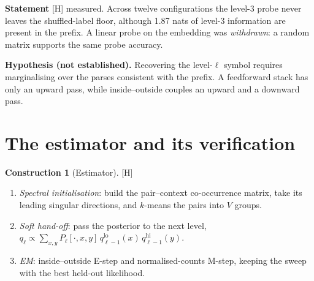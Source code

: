 \documentclass[11pt]{article}
\theoremstyle{definition}
\newtheorem{construction}[theorem]{Construction}
\theoremstyle{remark}
\newcommand{\src}[1]{\textsf{\small[#1]}}
\newcommand{\st}[1]{\textsf{\small\color{gray}#1}}
\begin{document}
\noindent\textbf{Statement} \src{H} \st{measured}. Across twelve configurations the level-3 probe never leaves the shuffled-label floor, although 1.87 nats of level-3 information are present in the prefix. A linear probe on the embedding was \emph{withdrawn}: a random matrix supports the same probe accuracy.

\noindent\textbf{Hypothesis (not established).} Recovering the level-$\ell$ symbol requires marginalising over the parses consistent with the prefix. A feedforward stack has only an upward pass, while inside--outside couples an upward and a downward pass.

\section{The estimator and its verification}
\begin{construction}[Estimator]\src{H}
\begin{enumerate}
  \item \emph{Spectral initialisation}: build the pair--context co-occurrence matrix, take its leading singular directions, and $k$-means the pairs into $V$ groups.
  \item \emph{Soft hand-off}: pass the posterior to the next level, $q_\ell\propto\sum_{x,y}P_\ell[\cdot,x,y]\,q^{\text{lo}}_{\ell-1}(x)\,q^{\text{hi}}_{\ell-1}(y)$.
  \item \emph{EM}: inside--outside E-step and normalised-counts M-step, keeping the sweep with the best held-out likelihood.
\end{enumerate}
\end{construction}
\end{document}
